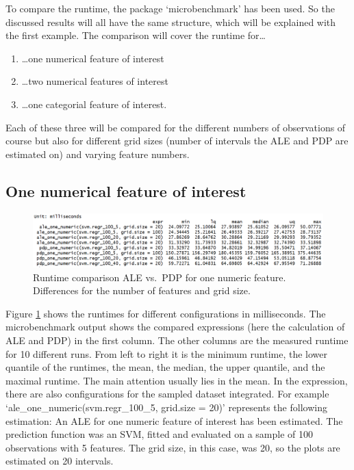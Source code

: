 \documentclass[]{krantz}
\providecommand{\tightlist}{%
  \setlength{\itemsep}{0pt}\setlength{\parskip}{0pt}}
\begin{document}
To compare the runtime, the package `microbenchmark' has been used. So
the discussed results will all have the same structure, which will be
explained with the first example. The comparison will cover the runtime
for\ldots{}

\begin{enumerate}
\def\labelenumi{\arabic{enumi}.}
\tightlist
\item
  \ldots{}one numerical feature of interest
\item
  \ldots{}two numerical features of interest
\item
  \ldots{}one categorial feature of interest.
\end{enumerate}

Each of these three will be compared for the different numbers of
observations of course but also for different grid sizes (number of
intervals the ALE and PDP are estimated on) and varying feature numbers.

\subsection{One numerical feature of
interest}\label{one-numerical-feature-of-interest}

\begin{figure}
\includegraphics[width=1\linewidth]{images/ale_1_one_numeric_cols_and_gridsize} \caption{Runtime comparison ALE vs.~PDP for
one numeric feature. Differences for the number of features and grid
size.}\label{fig:runtime1DnumColAndSize}
\end{figure}





Figure \ref{fig:runtime1DnumColAndSize} shows the runtimes for different
configurations in milliseconds. The microbenchmark output shows the
compared expressions (here the calculation of ALE and PDP) in the first
column. The other columns are the measured runtime for 10 different
runs. From left to right it is the minimum runtime, the lower quantile
of the runtimes, the mean, the median, the upper quantile, and the
maximal runtime. The main attention usually lies in the mean. In the
expression, there are also configurations for the sampled dataset
integrated. For example `ale\_one\_numeric(svm.regr\_100\_5, grid.size =
20)' represents the following estimation: An ALE for one numeric feature
of interest has been estimated. The prediction function was an SVM,
fitted and evaluated on a sample of 100 observations with 5 features.
The grid size, in this case, was 20, so the plots are estimated on 20
intervals.
\end{document}
